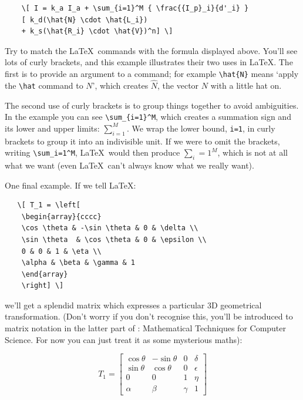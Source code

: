 \begin{refsection}
\begin{verbatim}
    \[ I = k_a I_a + \sum_{i=1}^M { \frac{{I_p}_i}{d'_i} }
    [ k_d(\hat{N} \cdot \hat{L_i}) 
    + k_s(\hat{R_i} \cdot \hat{V})^n] \]
\end{verbatim}
%
Try to match the \LaTeX\ commands with the formula displayed above. You'll see lots of curly brackets, and this example illustrates their two uses in \LaTeX. The first is to provide an argument to a command; for example \verb|\hat{N}| means `apply the \verb|\hat| command to $N$', which creates \(\hat{N}\), the vector \( N \) with a little hat  on.  

The second use of curly brackets is to group things together to avoid ambiguities. In the example you can see \verb|\sum_{i=1}^M|, which creates a summation sign and its lower and upper limits: \( \sum_{i=1}^{M} \). We wrap the lower bound, \verb|i=1|, in curly brackets to group it into an indivisible unit. If we were to omit the brackets, writing \verb|\sum_i=1^M|, \LaTeX\ would then produce \( \sum_i=1^M \), which is not at all what we want (even \LaTeX\ can't always know what we really want).

One final example. If we tell \LaTeX:

\begin{verbatim}
   \[ T_1 = \left[
    \begin{array}{cccc}
    \cos \theta & -\sin \theta & 0 & \delta \\
    \sin \theta  & \cos \theta & 0 & \epsilon \\
    0 & 0 & 1 & \eta \\
    \alpha & \beta & \gamma & 1
    \end{array}
    \right] \]
\end{verbatim}
%
we'll get a splendid matrix which expresses a particular 3D geometrical transformation. (Don't worry if you don't recognise this, you'll be introduced to matrix notation in the latter part of : Mathematical Techniques for Computer Science. For now you can just treat it as some mysterious maths):

\[   T_1 = \left[
    \begin{array}{cccc}
    \cos \theta & -\sin \theta & 0 & \delta \\
    \sin \theta  & \cos \theta & 0 & \epsilon \\
    0 & 0 & 1 & \eta \\
    \alpha & \beta & \gamma & 1
    \end{array}
    \right]
\]
%


\end{refsection}
